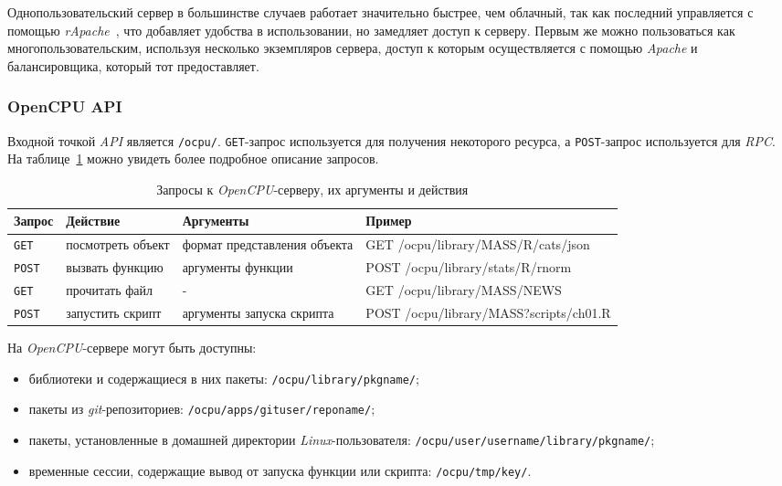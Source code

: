 Однопользовательский сервер в большинстве случаев работает значительно быстрее, чем облачный, так как последний управляется с помощью \emph{rApache}~\cite{rapache}, что добавляет удобства в использовании, но замедляет доступ к серверу. Первым же можно пользоваться как многопользовательским, используя несколько экземпляров сервера, доступ к которым осуществляется с помощью \emph{Apache} и балансировщика, который тот предоставляет.

\subsubsection{OpenCPU API}
Входной точкой \emph{API} является \texttt{/ocpu/}.
\texttt{GET}-запрос используется для получения некоторого ресурса, а \texttt{POST}-запрос используется для \emph{RPC}. На таблице~\ref{ocpu_api} можно увидеть более подробное описание запросов.

\begin{table}[!h]
  \small
\caption{Запросы к \emph{OpenCPU}-серверу, их аргументы и действия}\label{ocpu_api}
\centering
\begin{tabular}{|l|p{2.5cm}|p{2.5cm}|l|}
  \hline
Запрос        & Действие          & Аргументы                    & Пример                                 \\\hline 
\texttt{GET}  & посмотреть объект & формат представления объекта & GET /ocpu/library/MASS/R/cats/json     \\\hline
\texttt{POST} & вызвать функцию   & аргументы функции            & POST /ocpu/library/stats/R/rnorm       \\\hline
\texttt{GET}  & прочитать файл    & -                            & GET /ocpu/library/MASS/NEWS            \\\hline
\texttt{POST} & запустить скрипт  & аргументы запуска скрипта    & POST /ocpu/library/MASS?scripts/ch01.R \\\hline
\end{tabular}
\end{table}

На \emph{OpenCPU}-сервере могут быть доступны:
\begin{itemize}
\item библиотеки и содержащиеся в них пакеты: \texttt{/ocpu/library/{pkgname}/};
\item пакеты из \emph{git}-репозиториев: \texttt{/ocpu/apps/{gituser}/{reponame}/};
\item пакеты, установленные в домашней директории \emph{Linux}-пользователя: \texttt{/ocpu/user/{username}/library/{pkgname}/};
\item временные сессии, содержащие вывод от запуска функции или скрипта: \texttt{/ocpu/tmp/{key}/}.
\end{itemize}

